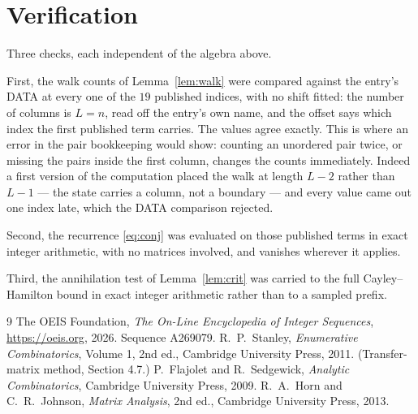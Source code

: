 \documentclass[11pt,a4paper]{article}
\theoremstyle{plain}
\theoremstyle{definition}
\begin{document}
\section{Verification}

Three checks, each independent of the algebra above.

First, the walk counts of Lemma~\ref{lem:walk} were compared against the entry's DATA at
every one of the $19$ published indices, with no shift fitted: the number of columns is
$L=n$, read off the entry's own name, and the offset says which index the first
published term carries. The values agree exactly. This is where an error in the pair
bookkeeping would show: counting an unordered pair twice, or missing the pairs inside the
first column, changes the counts immediately. Indeed a first version of the computation
placed the walk at length $L-2$ rather than $L-1$ --- the state carries a column, not a
boundary --- and every value came out one index late, which the DATA comparison rejected.

Second, the recurrence \eqref{eq:conj} was evaluated on those published terms in exact
integer arithmetic, with no matrices involved, and vanishes wherever it applies.

Third, the annihilation test of Lemma~\ref{lem:crit} was carried to the full
Cayley--Hamilton bound in exact integer arithmetic rather than to a sampled prefix.

\begin{thebibliography}{9}
 The OEIS Foundation, \emph{The On-Line Encyclopedia of Integer
Sequences}, \url{https://oeis.org}, 2026. Sequence A269079.
 R.~P.~Stanley, \emph{Enumerative Combinatorics}, Volume 1, 2nd ed.,
Cambridge University Press, 2011. (Transfer-matrix method, Section 4.7.)
 P.~Flajolet and R.~Sedgewick, \emph{Analytic Combinatorics}, Cambridge
University Press, 2009.
 R.~A.~Horn and C.~R.~Johnson, \emph{Matrix Analysis}, 2nd ed., Cambridge
University Press, 2013.
\end{thebibliography}
\end{document}
